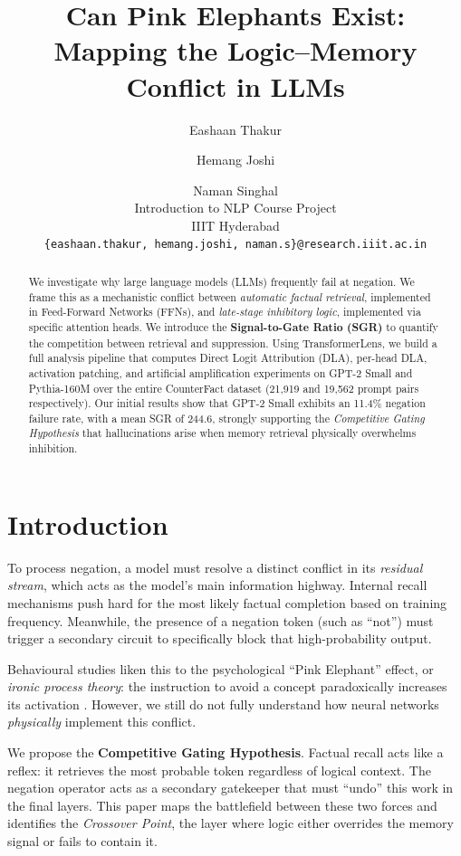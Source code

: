 \documentclass[11pt]{article}
\title{Can Pink Elephants Exist:\\Mapping the Logic--Memory Conflict in LLMs}
\author{
  Eashaan Thakur \and Hemang Joshi \and Naman Singhal \\
  Introduction to NLP Course Project \\
  IIIT Hyderabad \\
  \texttt{\{eashaan.thakur, hemang.joshi, naman.s\}@research.iiit.ac.in}
}
\begin{document}
\maketitle

\begin{abstract}
We investigate why large language models (LLMs) frequently fail at negation.
We frame this as a mechanistic conflict between \emph{automatic factual
retrieval}, implemented in Feed-Forward Networks (FFNs), and \emph{late-stage
inhibitory logic}, implemented via specific attention heads.
We introduce the \textbf{Signal-to-Gate Ratio (SGR)} to quantify the
competition between retrieval and suppression.
Using TransformerLens, we build a full analysis pipeline that computes
Direct Logit Attribution (DLA), per-head DLA, activation patching, and
artificial amplification experiments on GPT-2 Small and Pythia-160M over
the entire CounterFact dataset (21,919 and 19,562 prompt pairs respectively).
Our initial results show that GPT-2 Small exhibits an 11.4\% negation
failure rate, with a mean SGR of 244.6, strongly supporting the
\emph{Competitive Gating Hypothesis} that hallucinations arise when memory
retrieval physically overwhelms inhibition.
\end{abstract}

\section{Introduction}

To process negation, a model must resolve a distinct conflict in its
\emph{residual stream}, which acts as the model's main information highway.
Internal recall mechanisms push hard for the most likely factual completion
based on training frequency.  Meanwhile, the presence of a negation token
(such as ``not'') must trigger a secondary circuit to specifically block
that high-probability output.

Behavioural studies liken this to the psychological ``Pink Elephant'' effect,
or \emph{ironic process theory}: the instruction to avoid a concept
paradoxically increases its activation \cite{vrabcova-etal-2024-pink}.  However, we
still do not fully understand how neural networks \emph{physically}
implement this conflict.

We propose the \textbf{Competitive Gating Hypothesis}.  Factual recall acts
like a reflex: it retrieves the most probable token regardless of logical
context.  The negation operator acts as a secondary gatekeeper that must
``undo'' this work in the final layers.  This paper maps the battlefield
between these two forces and identifies the \emph{Crossover Point}, the
layer where logic either overrides the memory signal or fails to contain it.
\end{document}
